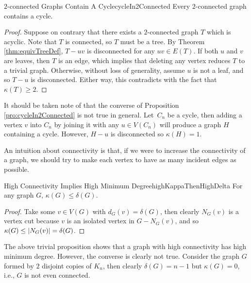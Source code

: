 \documentclass[math]{amznotes}
\theoremstyle{remark}
\begin{document}
\begin{probox}{$2$-connected Graphs Contain A Cycle}{cycleIn2Connected}
    Every $2$-connected graph contains a cycle.
    \tcblower
    \begin{proof}
        Suppose on contrary that there exists a $2$-connected graph $T$ which is acyclic. Note that $T$ is connected, so $T$ must be a tree. By Theorem \ref{thm:equivTreeDef}, $T - uv$ is disconnected for any $uv \in E(T)$. If both $u$ and $v$ are leaves, then $T$ is an edge, which implies that deleting any vertex reduces $T$ to a trivial graph. Otherwise, without loss of generality, assume $u$ is not a leaf, and so $T - u$ is disconnected. Either way, this contradicts with the fact that $\kappa(T) \geq 2$.
    \end{proof}
\end{probox}
It should be taken note of that the converse of Proposition \ref{pro:cycleIn2Connected} is not true in general. Let~$C_n$ be a cycle, then adding a vertex $v$ into $C_n$ by joining it with any $u \in V(C_n)$ will produce a graph $H$ containing a cycle. However, $H - u$ is disconnected so $\kappa(H) = 1$.

An intuition about connectivity is that, if we were to increase the connectivity of a graph, we should try to make each vertex to have as many incident edges as possible.
\begin{probox}{High Connectivity Implies High Minimum Degree}{highKappaThenHighDelta}
    For any graph $G$, $\kappa(G) \leq \delta(G)$.
    \tcblower
    \begin{proof}
        Take some $v \in V(G)$ with $d_G(v) = \delta(G)$, then clearly $N_G(v)$ is a vertex cut because $v$ is an isolated vertex in $G - N_G(v)$, and so $\kappa(G) \leq {\left\lvert {N_G(v)} \right\rvert} = \delta(G)$.
    \end{proof}
\end{probox}
The above trivial proposition shows that a graph with high connectivity has high minimum degree. However, the converse is clearly not true. Consider the graph $G$ formed by $2$ disjoint copies of $K_n$, then clearly $\delta(G) = n - 1$ but $\kappa(G) = 0$, i.e., $G$ is not even connected.
\end{document}
